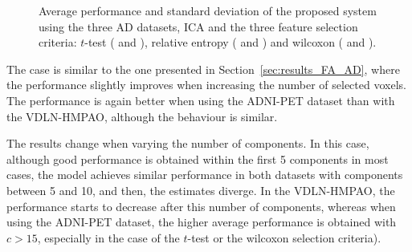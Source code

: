 \begin{figure}
	
	\caption[Average performance of the \acs{AD} datasets in \acs{ICA}.]{Average performance and standard deviation of the proposed system using the three \ac{AD} datasets, \ac{ICA} and the three feature selection criteria: $t$-test (\protect{} and \protect{}), relative entropy (\protect{} and \protect{}) and wilcoxon (\protect{} and \protect{}). } 
	\label{fig:accuracyMeanICA-AD}
\end{figure}

The case is similar to the one presented in Section~\ref{sec:results_FA_AD}, where the performance slightly improves when increasing the number of selected voxels. The performance is again better when using the ADNI-PET dataset than with the VDLN-HMPAO, although the behaviour is similar. 

The results change when varying the number of components. In this case, although good performance is obtained within the first 5 components in most cases, the model achieves similar performance in both datasets with components between 5 and 10, and then, the estimates diverge. In the VDLN-HMPAO, the performance starts to decrease after this number of components, whereas when using the ADNI-PET dataset, the higher average performance is obtained with $c>15$, especially in the case of the $t$-test or the wilcoxon selection criteria). 

